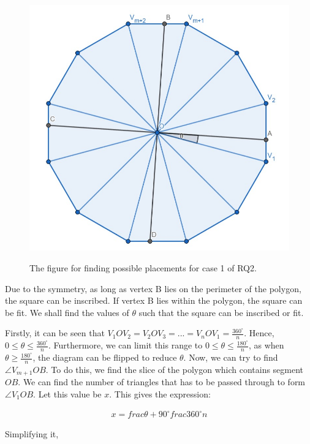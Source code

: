 \documentclass[12pt]{scrartcl}
\begin{document}
\begin{figure}[htpb]
	\centering
	\includegraphics[scale=.75]{images/rq2_1_1.jpg}
	\label{fig:rq2_1_1_img}
	\caption{The figure for finding possible placements for case 1 of RQ2.}
\end{figure}

Due to the symmetry, as long as vertex B lies on the perimeter of the polygon, the square can be inscribed. If vertex B lies within the polygon, the square can be fit. We shall find the values of $\theta$ such that the square can be inscribed or fit.

Firstly, it can be seen that $V_{1}OV_{2} = V_{2}OV_{3} = ... = V_{n}OV_{1} = \frac{360^{\circ}}{n}$.
Hence, $0 \leq \theta \leq \frac{360^{\circ}}{n}$.
Furthermore, we can limit this range to $0 \leq \theta \leq \frac{180^{\circ}}{n}$, as when $\theta \geq \frac{180^{\circ}}{n}$, the diagram can be flipped to reduce $\theta$.
Now, we can try to find $\angle V_{m+1}OB$. To do this, we find the slice of the polygon which contains segment $OB$. We can find the number of triangles that has to be passed through to form $\angle V_{1}OB$. Let this value be $x$. This gives the expression:

\begin{align*}
	 x = frac{\theta + 90^{\circ}}{frac{360^{\circ}}{n}}
\end{align*}

Simplifying it,
\end{document}
